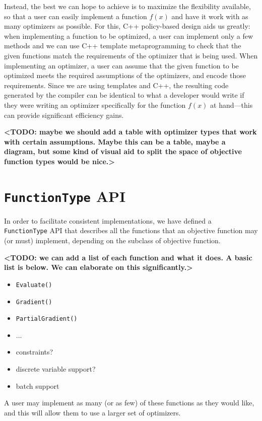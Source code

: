 \documentclass{article}
\begin{document}
Instead, the best we can hope to achieve is to maximize the flexibility
available, so that a user can easily implement a function $f(x)$ and have it
work with as many optimizers as possible.  For this, C++ policy-based design
aids us greatly: when implementing a function to be optimized, a user can
implement only a few methods and we can use C++ template metaprogramming to
check that the given functions match the requirements of the optimizer that is
being used.  When implementing an optimizer, a user can assume that the given
function to be optimized meets the required assumptions of the optimizers, and
encode those requirements.  Since we are using templates and C++, the resulting
code generated by the compiler can be identical to what a developer would write
if they were writing an optimizer specifically for the function $f(x)$ at
hand---this can provide significant efficiency gains.

{\bf <TODO: maybe we should add a table with optimizer types that work with
certain assumptions.  Maybe this can be a table, maybe a diagram, but some kind
of visual aid to split the space of objective function types would be nice.>}

\section{{\tt FunctionType} API}

In order to facilitate consistent implementations, we have defined a {\tt
FunctionType} API that describes all the functions that an objective function
may (or must) implement, depending on the subclass of objective function.

{\bf <TODO: we can add a list of each function and what it does.  A basic list
is below.  We can elaborate on this significantly.>}

\begin{itemize}
  \item {\tt Evaluate()}
  \item {\tt Gradient()}
  \item {\tt PartialGradient()} 
  \item ...
  \item constraints?
  \item discrete variable support?
  \item batch support
\end{itemize}

A user may implement as many (or as few) of these functions as they would like,
and this will allow them to use a larger set of optimizers.
\end{document}
